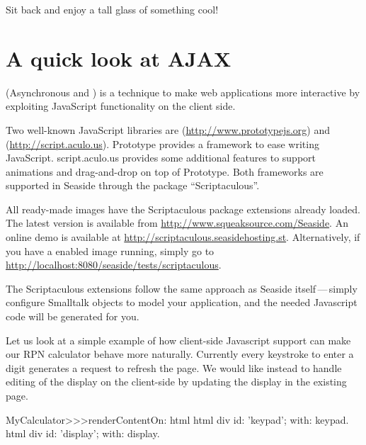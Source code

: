 \documentclass[a4paper,10pt,twoside]{book}
\begin{document}
Sit back and enjoy a tall glass of something cool!

\section{A quick look at AJAX}


 (Asynchronous  and ) is a technique to make web applications more interactive by exploiting JavaScript functionality on the client side.

Two well-known JavaScript libraries are  (\url{http://www.prototypejs.org}) and  (\url{http://script.aculo.us}).
Prototype provides a framework to ease writing JavaScript.
script.aculo.us provides some additional features to support animations and drag-and-drop on top of Prototype.
Both frameworks are supported in Seaside through the package ``Scriptaculous''.

All ready-made images have the Scriptaculous package extensions already loaded.
The latest version is available from \url{http://www.squeaksource.com/Seaside}.
An online demo is available at \url{http://scriptaculous.seasidehosting.st}.
Alternatively, if you have a enabled image running, simply go to \url{http://localhost:8080/seaside/tests/scriptaculous}.

The Scriptaculous extensions follow the same approach as Seaside itself\,---\,simply configure Smalltalk objects to model your application, and the needed Javascript code will be generated for you.

Let us look at a simple example of how client-side Javascript support can make our RPN calculator behave more naturally.
Currently every keystroke to enter a digit generates a request to refresh the page.
We would like instead to handle editing of the display on the client-side by updating the display in the existing page.


\begin{code}{}
MyCalculator>>>renderContentOn: html
	html div id: 'keypad'; with: keypad.
	html div id: 'display'; with: display.	
\end{code}
\end{document}
